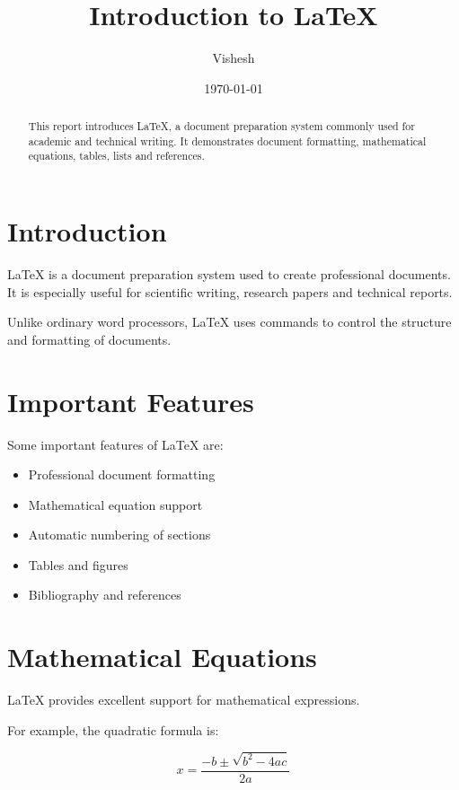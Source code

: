 \documentclass[12pt,a4paper]{article}
\title{\textbf{Introduction to LaTeX}}
\author{Vishesh}
\date{\today}
\begin{document}
\maketitle

\begin{abstract}
This report introduces LaTeX, a document preparation
system commonly used for academic and technical writing.
It demonstrates document formatting, mathematical
equations, tables, lists and references.
\end{abstract}

\tableofcontents
\newpage

\section{Introduction}

LaTeX is a document preparation system used to create
professional documents. It is especially useful for
scientific writing, research papers and technical reports.

Unlike ordinary word processors, LaTeX uses commands
to control the structure and formatting of documents.

\section{Important Features}

Some important features of LaTeX are:

\begin{itemize}
    \item Professional document formatting
    \item Mathematical equation support
    \item Automatic numbering of sections
    \item Tables and figures
    \item Bibliography and references
\end{itemize}

\section{Mathematical Equations}

LaTeX provides excellent support for mathematical
expressions.

For example, the quadratic formula is:

\begin{equation}
x = \frac{-b \pm \sqrt{b^2 - 4ac}}{2a}
\end{equation}
\end{document}
